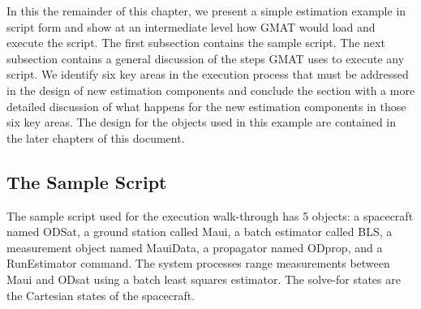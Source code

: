 In this the remainder of this chapter, we present a simple estimation example in script form and
show at an intermediate level how GMAT would load and execute the script.  The first subsection
contains the sample script. The next subsection contains a general discussion of the steps GMAT uses
to execute any script.  We identify six key areas in the execution process that must be addressed in
the design of new estimation components and conclude the section with a more detailed discussion of
what happens for the new estimation components in those six key areas.  The design for the objects
used in this example are contained in the later chapters of this document.

\subsection{The Sample Script}

The sample script used for the execution walk-through has 5 objects:  a spacecraft named ODSat, a
ground station called Maui, a batch estimator called BLS, a measurement object named MauiData, a
propagator named ODprop, and a RunEstimator command.   The system processes range measurements
between Maui and ODsat using a batch least squares estimator.    The solve-for states are the
Cartesian states of the spacecraft.

